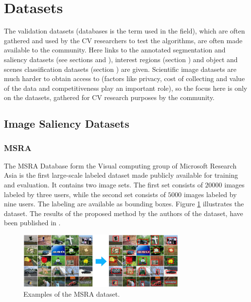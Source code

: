 \section{Datasets}
\label{sec:db}

The validation datasets (databases is the term used in the field), which are often gathered and used by the CV researchers to test the algorithms, are often made available to the community. Here links to the annotated segmentation and saliency datasets (see sections \underline{} and  \underline{}), interest regions (section \underline{}) and object and scenes classification datasets (section \underline{}) are given. Scientific image datasets are much harder to obtain access to (factors like privacy, cost of collecting and value of the data and competitiveness play an important role), so the focus here is only on the datasets, gathered for CV research purposes by the community.

\subsection{Image Saliency Datasets}\label{db:subsec:sal}
\subsubsection{MSRA}\label{subsec:msra}
The MSRA  Database form the Visual computing group of Microsoft Research Asia \cite{msra_db} is  the first large-scale labeled dataset made publicly available for training and evaluation. It contains two image sets. The first set consists of $20 000$ images labeled by three users, while the second set consists of $5000$ images labeled by nine users. The labeling are available as bounding boxes. Figure \ref{fig:msra} illustrates the dataset. The results of the proposed method by the authors of the dataset, have been published in \cite{LiuCVPR2007}.
\begin{figure}[h]
\begin{center}
\includegraphics[width=0.75\textwidth]{fig/MSRA}
\end{center}
\caption{Examples of the MSRA dataset.}
\label{fig:msra}
\end{figure}


